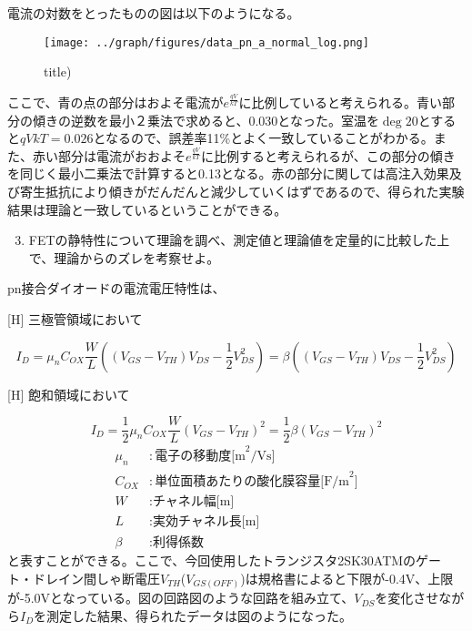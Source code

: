 \documentclass[a4j,dvipdfmx]{article}
\begin{document}
電流の対数をとったものの図は以下のようになる。
\begin{figure}[H]
  \begin{center}
  \texttt{[image: ../graph/figures/data\_pn\_a\_normal\_log.png]}
  \caption{title)}
  \end{center}
\end{figure}
ここで、青の点の部分はおよそ電流が$e^{\frac{qV}{kT}}$に比例していると考えられる。青い部分の傾きの逆数を最小２乗法で求めると、0.030となった。室温を$\deg{20}$とすると${qV}{kT}=0.026$となるので、誤差率11\%とよく一致していることがわかる。また、赤い部分は電流がおおよそ$e^{\frac{qV}{kT}}$に比例すると考えられるが、この部分の傾きを同じく最小二乗法で計算すると0.13となる。赤の部分に関しては高注入効果及び寄生抵抗により傾きがだんだんと減少していくはずであるので、得られた実験結果は理論と一致しているということができる。

\begin{enumerate}[label={(\arabic*)}]
  \setcounter{enumi}{2}
  \item FETの静特性について理論を調べ、測定値と理論値を定量的に比較した上で、理論からのズレを考察せよ。
\end{enumerate}

pn接合ダイオードの電流電圧特性は、\\
\begin{center}[H]
  三極管領域において
\end{center}
$$
I_D = \mu_nC_{OX}\frac{W}{L}\left((V_{GS}-V_{TH})V_{DS} - \frac{1}{2}V_{DS}^2\right) = \beta\left((V_{GS}-V_{TH})V_{DS} - \frac{1}{2}V_{DS}^2\right)
$$
\begin{center}[H]
    飽和領域において
\end{center}
$$
I_D = \frac{1}{2}\mu_nC_{OX}\frac{W}{L}\left(V_{GS}-V_{TH}\right)^2 = \frac{1}{2}\beta(V_{GS}-V_{TH})^2
$$
\begin{align}[H]
  \mu_n &: \mbox{電子の移動度[m}^2\mbox{/Vs]}\nonumber \\
  C_{OX} &: \mbox{単位面積あたりの酸化膜容量[F/m}^2\mbox{]} \nonumber \\
  W &: \mbox{チャネル幅[m]} \nonumber \\
  L &: \mbox{実効チャネル長[m]} \nonumber \\
  \beta &: \mbox{利得係数} \nonumber
\end{align}
と表すことができる。ここで、今回使用したトランジスタ2SK30ATMのゲート・ドレイン間しゃ断電圧$V_{TH}$($V_{GS(OFF)}$)は規格書によると下限が-0.4V、上限が-5.0Vとなっている。図の回路図のような回路を組み立て、$V_{DS}$を変化させながら$I_D$を測定した結果、得られたデータは図のようになった。
\end{document}
